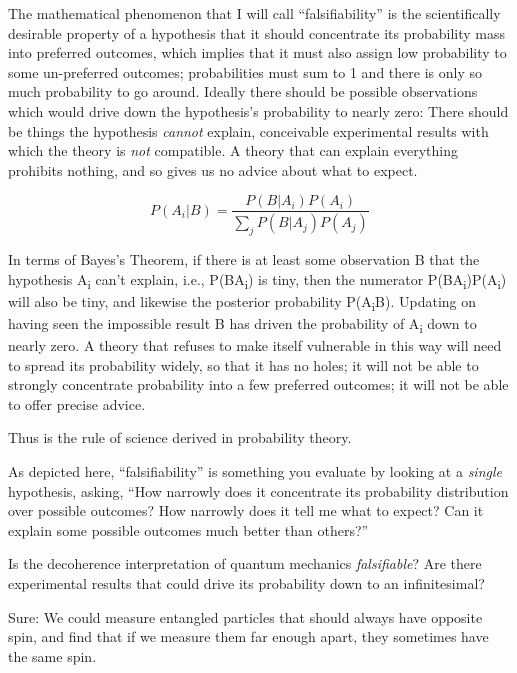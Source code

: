 {
 The mathematical phenomenon that I will call
``falsifiability'' is the
scientifically desirable property of a hypothesis that it should
concentrate its probability mass into preferred outcomes, which implies
that it must also assign low probability to some un-preferred outcomes;
probabilities must sum to 1 and there is only so much probability to go
around. Ideally there should be possible observations which would drive
down the hypothesis's probability to nearly zero: There
should be things the hypothesis \textit{cannot} explain, conceivable
experimental results with which the theory is \textit{not} compatible.
A theory that can explain everything prohibits nothing, and so gives us
no advice about what to expect.}

\begin{equation*}
  P(A_i|B) = \frac{P(B|A_i)P(A_i)}
  {\sum_j P(B|A_j)P(A_j)}
\end{equation*}



\bigskip

{
 In terms of Bayes's Theorem, if there is at least
some observation B that the hypothesis A\textsubscript{i}
can't explain, i.e., P(B{\textbar}A\textsubscript{i})
is tiny, then the numerator
P(B{\textbar}A\textsubscript{i})P(A\textsubscript{i}) will also be
tiny, and likewise the posterior probability
P(A\textsubscript{i}{\textbar}B). Updating on having seen the
impossible result B has driven the probability of A\textsubscript{i}
down to nearly zero. A theory that refuses to make itself vulnerable in
this way will need to spread its probability widely, so that it has no
holes; it will not be able to strongly concentrate probability into a
few preferred outcomes; it will not be able to offer precise advice.}

{
 Thus is the rule of science derived in probability theory.}

{
 As depicted here,
``falsifiability'' is something you
evaluate by looking at a \textit{single} hypothesis, asking,
``How narrowly does it concentrate its probability
distribution over possible outcomes? How narrowly does it tell me what
to expect? Can it explain some possible outcomes much better than
others?''}

{
 Is the decoherence interpretation of quantum mechanics
\textit{falsifiable}? Are there experimental results that could drive
its probability down to an infinitesimal?}

{
 Sure: We could measure entangled particles that should always have
opposite spin, and find that if we measure them far enough apart, they
sometimes have the same spin.}


